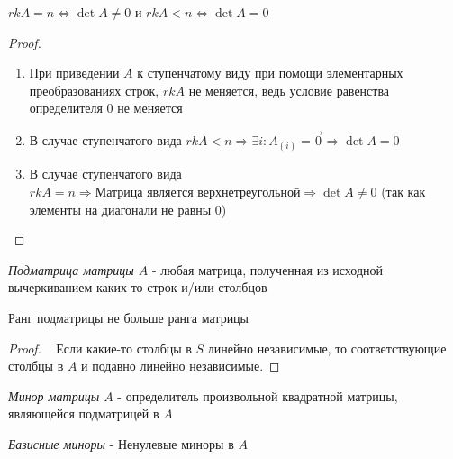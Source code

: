 \begin{lemma}

    $rk A = n \Leftrightarrow \det A \not= 0$ и $rk A < n \Leftrightarrow \det A = 0$

    \begin{proof}

        \begin{enumerate}
            \item При приведении $A$ к ступенчатому виду при помощи элементарных преобразованиях строк, $rk A$ не меняется, ведь условие равенства определителя 0 не меняется
            \item В случае ступенчатого вида $rk A < n \Rightarrow \exists i : A_{(i)} = \vec{0} \Rightarrow \det A = 0$
            \item В случае ступенчатого вида $rk A = n \Rightarrow \text{Матрица является верхнетреугольной} \Rightarrow \det A \not= 0$ (так как элементы на диагонали не равны 0) 
        \end{enumerate}
        
    \end{proof}
    
\end{lemma}


\begin{definition}
    
    \textit{Подматрица матрицы $A$} - любая матрица, полученная из исходной вычеркиванием каких-то строк и/или столбцов

\end{definition}


\begin{lemma}
    
    Ранг подматрицы не больше ранга матрицы

    \begin{proof}~
        Если какие-то столбцы в $S$ линейно независимые, то соответствующие столбцы в $A$ и подавно линейно независимые.
    \end{proof}

\end{lemma}


\begin{definition}
    
    \textit{Минор матрицы $A$} - определитель произвольной квадратной матрицы, являющейся подматрицей в $A$

\end{definition}


\begin{definition}
    
    \textit{Базисные миноры} - Ненулевые миноры в $A$

\end{definition}


